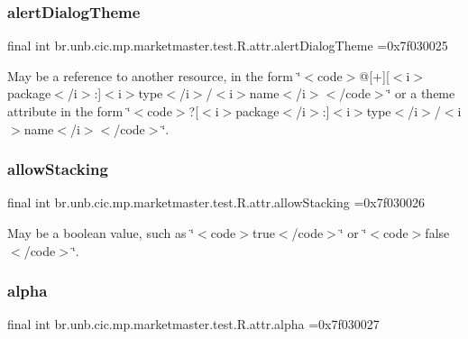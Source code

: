 \subsubsection{\texorpdfstring{alert\+Dialog\+Theme}{alertDialogTheme}}
{\footnotesize\ttfamily final int br.\+unb.\+cic.\+mp.\+marketmaster.\+test.\+R.\+attr.\+alert\+Dialog\+Theme =0x7f030025\hspace{0.3cm}{\ttfamily [static]}}

May be a reference to another resource, in the form \char`\"{}$<$code$>$@\mbox{[}+\mbox{]}\mbox{[}$<$i$>$package$<$/i$>$\+:\mbox{]}$<$i$>$type$<$/i$>$/$<$i$>$name$<$/i$>$$<$/code$>$\char`\"{} or a theme attribute in the form \char`\"{}$<$code$>$?\mbox{[}$<$i$>$package$<$/i$>$\+:\mbox{]}$<$i$>$type$<$/i$>$/$<$i$>$name$<$/i$>$$<$/code$>$\char`\"{}. \mbox{\label{classbr_1_1unb_1_1cic_1_1mp_1_1marketmaster_1_1test_1_1R_1_1attr_ad2c3e7d08e87a2296a0b759f183aded0}} 
\subsubsection{\texorpdfstring{allow\+Stacking}{allowStacking}}
{\footnotesize\ttfamily final int br.\+unb.\+cic.\+mp.\+marketmaster.\+test.\+R.\+attr.\+allow\+Stacking =0x7f030026\hspace{0.3cm}{\ttfamily [static]}}

May be a boolean value, such as \char`\"{}$<$code$>$true$<$/code$>$\char`\"{} or \char`\"{}$<$code$>$false$<$/code$>$\char`\"{}. \mbox{\label{classbr_1_1unb_1_1cic_1_1mp_1_1marketmaster_1_1test_1_1R_1_1attr_a15bac60f11a6f0a3e15cf80e402b4abd}} 
\subsubsection{\texorpdfstring{alpha}{alpha}}
{\footnotesize\ttfamily final int br.\+unb.\+cic.\+mp.\+marketmaster.\+test.\+R.\+attr.\+alpha =0x7f030027\hspace{0.3cm}{\ttfamily [static]}}

